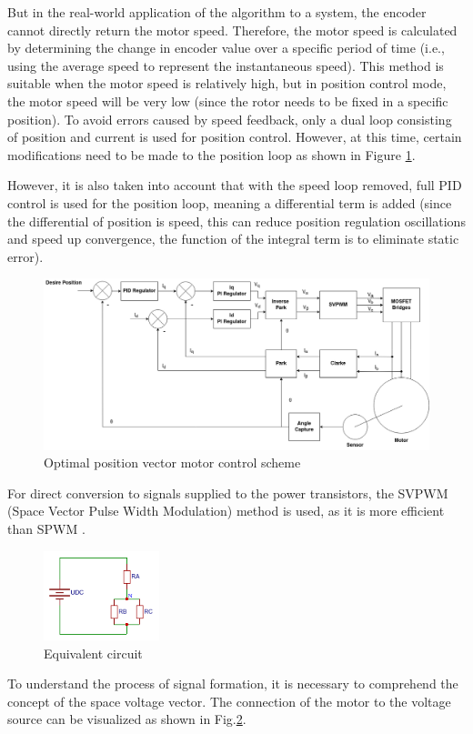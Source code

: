 But in the real-world application of the algorithm to a system, the encoder cannot directly return the motor speed. Therefore, the motor speed is calculated by determining the change in encoder value over a specific period of time (i.e., using the average speed to represent the instantaneous speed). This method is suitable when the motor speed is relatively high, but in position control mode, the motor speed will be very low (since the rotor needs to be fixed in a specific position).
To avoid errors caused by speed feedback, only a dual loop consisting of position and current is used for position control. However, at this time, certain modifications need to be made to the position loop as shown in Figure \ref{ACDFOCALGPOSREAL}.

However, it is also taken into account that with the speed loop removed, full PID control is used for the position loop, meaning a differential term is added (since the differential of position is speed, this can reduce position regulation oscillations and speed up convergence, the function of the integral term is to eliminate static error).

\begin{figure}[H]
	\centering
	\includegraphics[width=\textwidth]{Src/images/foc pos real.drawio.png}
	\caption{Optimal position vector motor control scheme}
	\label{ACDFOCALGPOSREAL}
\end{figure}



For direct conversion to signals supplied to the power transistors, the SVPWM (Space Vector Pulse Width Modulation) method is used, as it is more efficient than SPWM \citep{Mirdas2023}.


\begin{figure}[H]
	\centering
	\includegraphics[width=0.3\textwidth]{Src/images/3phasesimpl.png}
	\caption{Equivalent circuit}
	\label{ACDFOC3P}
\end{figure}
To understand the process of signal formation, it is necessary to comprehend the concept of the space voltage vector. The connection of the motor to the voltage source can be visualized as shown in Fig.\ref{ACDFOC3P}.

